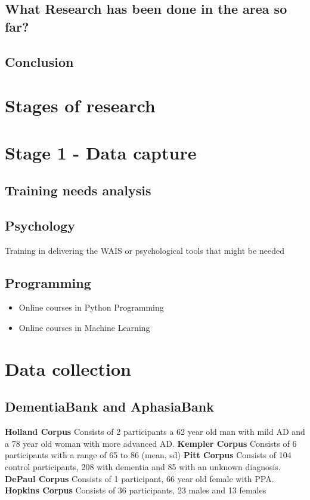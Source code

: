 \documentclass{article}
\begin{document}
	\subsection{What Research has been done in the area so far?}
	\subsection{Conclusion}
	
	\section{Stages of research}
	\section{Stage 1 - Data capture}
	\subsection{Training needs analysis}
	\subsection{Psychology}
	Training in delivering the WAIS or psychological tools that might be needed 
	\subsection{Programming}
	\begin{itemize}
		\item Online courses in Python Programming
		\item Online courses in Machine Learning
	\end{itemize}

	\section{Data collection}
	\subsection{DementiaBank and AphasiaBank}
	\textbf{Holland Corpus}
	\newline 
	Consists of 2 participants a 62 year old man with mild AD and a 78 year old woman with more advanced AD.
	\newline
	\textbf{Kempler Corpus}
	\newline
	Consists of 6 participants with a range of 65 to 86 (mean, sd)
	\newline
	\textbf{Pitt Corpus}
	\newline
	Consists of 104 control participants, 208 with dementia and 85 with an unknown diagnosis.
	\newline
	\textbf{DePaul Corpus}
	\newline
	Consists of 1 participant, 66 year old female with PPA.
	\newline
	\textbf{Hopkins Corpus}
	\newline
	Consists of 36 participants, 23 males and 13 females	
\end{document}
